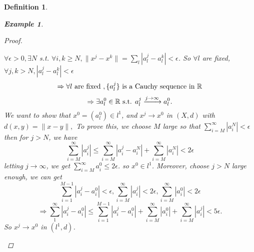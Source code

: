 \documentclass{article}
\newtheorem*{definition}{Definition}
\newtheorem*{example}{Example}
\begin{document}
\begin{definition}
\begin{example}
\begin{enumerate}
\begin{proof}
\begin{itemize}
                    $\forall \epsilon > 0, \exists N$ s.t. $\forall i, k \ge N, \|x^j - x^k\| = \sum_{l}|a_l^j - a_l^k| < \epsilon$.
                    So $\forall l$ are fixed, $\forall j, k > N, |a_l^j - a_l^k| < \epsilon$
                    \[
                       \Rightarrow \forall l \textnormal{ are fixed }, \{a_l^j\} \textnormal{ is a Cauchy sequence in }\mathbb{R} 
                    \]
                    \[
                        \Rightarrow \exists a_l^0 \in \mathbb{R} \textnormal{ s.t. } a_l^j \xrightarrow{j \rightarrow \infty} a_l^0.
                    \]
                    We want to show that $x^0=(a_l^0) \in l^1$, and $x^j \rightarrow x^0$ in $(X, d)$ with $d(x, y) = \|x -y\|, $
                    To prove this, we choose $M$ large so that $\sum_{i=M}^{\infty}{|a_i^N|} < \epsilon$
                    then for $j > N$, we have
                    \[
                        \sum_{i=M}^{\infty}{|a_i^j|} \le \sum_{i=M}^{\infty}{|a_i^j - a_i^N| + \sum_{i=M}^{\infty}{|a_i^N|}} < 2 \epsilon
                    \]
                    letting $j \rightarrow \infty$, we get $\sum_{i=M}^{\infty}{a_i^0} \le 2 \epsilon$. so $x^0 \in l^1$.
                    Moreover, choose $j > N$ large enough, we can get
                    \[
                        \sum_{i=1}^{M-1}{|a_i^j - a_i^0|} < \epsilon,
                        \sum_{i=M}^{\infty}{|a_i^j|} < 2\epsilon,
                        \sum_{i=M}^{\infty}{|a_i^0|} < 2\epsilon
                    \]
                    \[
                        \Rightarrow \sum_{1}^{\infty}{|a_i^j - a_i^0|} \le \sum_{i=1}^{M-1}{|a_i^j - a_i^0|} + \sum_{i=M}^{\infty}{|a_i^0|} + \sum_{i=M}^{\infty}{|a_i^j|} < 5 \epsilon.
                    \]
                    So $x^j \rightarrow x^0$ in $(l^1, d)$.
                \end{itemize}        
            \end{proof}
        \end{enumerate}
    \end{example}
\end{definition}
\end{document}
